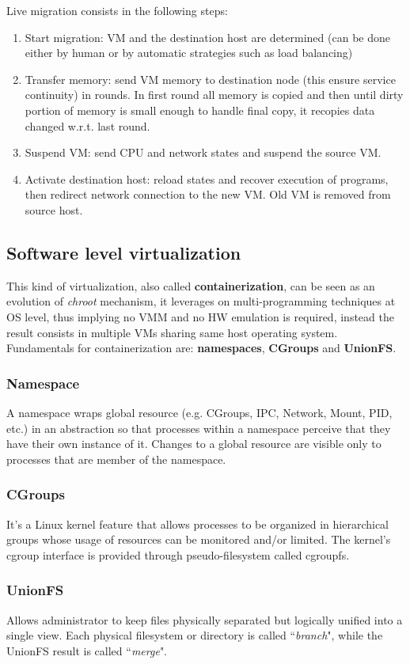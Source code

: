 \documentclass{article}
\begin{document}
Live migration consists in the following steps:
\begin{enumerate}
    \item Start migration: VM and the destination host are determined (can be done either by human or by automatic strategies such as load balancing)
    \item Transfer memory: send VM memory to destination node (this ensure service continuity) in rounds. In first round all memory is copied and then until dirty portion of memory is small enough to handle final copy, it recopies data changed w.r.t. last round.
    \item Suspend VM: send CPU and network states and suspend the source VM.
    \item Activate destination host: reload states and recover execution of programs, then redirect network connection to the new VM. Old VM is removed from source host.
\end{enumerate}

\subsection{Software level virtualization}
This kind of virtualization, also called \textbf{containerization}, can be seen as an evolution of \textit{chroot} mechanism, it leverages on multi-programming techniques at OS level, thus implying no VMM and no HW emulation is required, instead the result consists in multiple VMs sharing same host operating system. Fundamentals for containerization are: \textbf{namespaces}, \textbf{CGroups} and \textbf{UnionFS}.

\subsubsection{Namespace}
A namespace wraps global resource (e.g. CGroups, IPC, Network, Mount, PID, etc.) in an abstraction so that processes within a namespace perceive that they have their own instance of it. Changes to a global resource are visible only to processes that are member of the namespace.
\subsubsection{CGroups}
It's a Linux kernel feature that allows processes to be organized in hierarchical groups whose usage of resources can be monitored and/or limited. The kernel's cgroup interface is provided through pseudo-filesystem called cgroupfs.
\subsubsection{UnionFS}
Allows administrator to keep files physically separated but logically unified into a single view. Each physical filesystem or directory is called ``\textit{branch}", while the UnionFS result is called ``\textit{merge}". 
\end{document}
